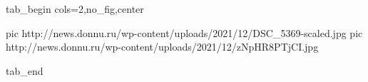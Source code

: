  
 
 
 
 

\ifcmt
  tab_begin cols=2,no_fig,center

     pic http://news.donnu.ru/wp-content/uploads/2021/12/DSC_5369-scaled.jpg
		 pic http://news.donnu.ru/wp-content/uploads/2021/12/zNpHR8PTjCI.jpg

  tab_end
\fi
